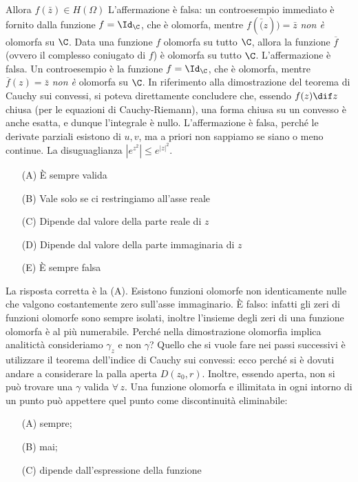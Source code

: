     Allora $f(\bar{z}) \in H(\Omega)$
    L'affermazione è falsa: un controesempio immediato è fornito dalla funzione $ f=\Id_{\C} $, che è olomorfa, mentre $ f(\bar(z))=\bar{z} $ \emph{non è} olomorfa su $ \C $.
    Data una funzione $ f $ olomorfa su tutto $ \C $, allora la funzione $ \overline{f} $ (ovvero il complesso coniugato di $ f $) è olomorfa su tutto $ \C $.
    L'affermazione è falsa. Un controesempio è la funzione $ f =\Id_{\C}  $, che è olomorfa, mentre $ \overline{f}(z)=\bar{z} $ \emph{non è} olomorfa su $ \C $.
    In riferimento alla dimostrazione del teorema di Cauchy sui convessi, si poteva direttamente concludere che, essendo $f(z)\dif z$ chiusa (per le equazioni di Cauchy-Riemann), una forma chiusa su un convesso è anche esatta, e dunque l'integrale è nullo.
    L'affermazione è falsa, perché le derivate parziali esistono di $u, v$, ma a priori non sappiamo se siano o meno continue.
    La disuguaglianza $|e^{z^2}| \leq e^{|z|^2}$.
    \begin{itemize}
        \item[(A)] È sempre valida
        \item[(B)] Vale solo se ci restringiamo all'asse reale
        \item[(C)] Dipende dal valore della parte reale di $z$
        \item[(D)] Dipende dal valore della parte immaginaria di $z$
        \item[(E)] È sempre falsa
    \end{itemize}
    La risposta corretta è la (A).
    Esistono funzioni olomorfe non identicamente nulle che valgono costantemente zero sull'asse immaginario.
    È falso: infatti gli zeri di funzioni olomorfe sono sempre isolati, inoltre l'insieme degli zeri di una funzione olomorfa è al più numerabile.
    Perché nella dimostrazione olomorfia implica analitictà consideriamo $\gamma_{z}$ e non $\gamma$?
    Quello che si vuole fare nei passi successivi è utilizzare il teorema dell'indice di Cauchy sui convessi: ecco perché si è dovuti andare a considerare la palla aperta $D(z_{0},r)$. Inoltre, essendo aperta, non si può trovare una $\gamma$ valida $\forall\,{z}$.
    Una funzione olomorfa e illimitata in ogni intorno di un punto può appettere quel punto come discontinuità eliminabile: \begin{itemize}
        \item[(A)] sempre; 
        \item[(B)] mai; 
        \item[(C)] dipende dall'espressione della funzione
    \end{itemize}
